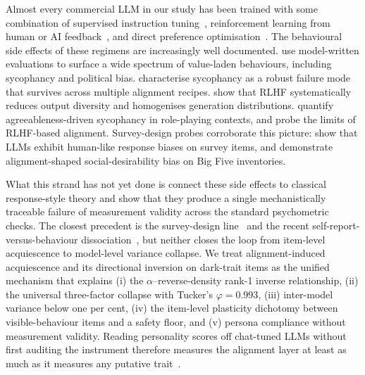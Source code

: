 Almost every commercial LLM in our study has been trained with some combination of supervised instruction tuning~\citep{wei2022flan,ouyang2022training}, reinforcement learning from human or AI feedback~\citep{christiano2017deep,ouyang2022training,bai2022constitutional}, and direct preference optimisation~\citep{rafailov2023dpo}. The behavioural side effects of these regimens are increasingly well documented. \citet{perez2023discovering} use model-written evaluations to surface a wide spectrum of value-laden behaviours, including sycophancy and political bias. \citet{sharma2024sycophancy} characterise sycophancy as a robust failure mode that survives across multiple alignment recipes. \citet{kirk2023understanding} show that RLHF systematically reduces output diversity and homogenises generation distributions. \citet{zheng2024agreeableness} quantify agreeableness-driven sycophancy in role-playing contexts, and \citet{wang2024aligning} probe the limits of RLHF-based alignment. Survey-design probes corroborate this picture: \citet{tjuatja2023response} show that LLMs exhibit human-like response biases on survey items, and \citet{acerbi2024llm,salecha2024llm} demonstrate alignment-shaped social-desirability bias on Big Five inventories.

What this strand has not yet done is connect these side effects to classical response-style theory and show that they produce a single mechanistically traceable failure of measurement validity across the standard psychometric checks. The closest precedent is the survey-design line~\citep{tjuatja2023response,dominguez2024questioning} and the recent self-report-versus-behaviour dissociation~\citep{han2025personality}, but neither closes the loop from item-level acquiescence to model-level variance collapse. We treat alignment-induced acquiescence and its directional inversion on dark-trait items as the unified mechanism that explains (i) the $\alpha$--reverse-density rank-1 inverse relationship, (ii) the universal three-factor collapse with Tucker's $\varphi=0.993$, (iii) inter-model variance below one per cent, (iv) the item-level plasticity dichotomy between visible-behaviour items and a safety floor, and (v) persona compliance without measurement validity. Reading personality scores off chat-tuned LLMs without first auditing the instrument therefore measures the alignment layer at least as much as it measures any putative trait~\citep{serpell2024validity,laverghetta2022predicting}.
